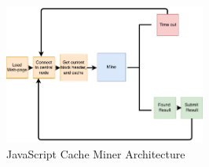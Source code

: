 \documentclass[10pt, conference, compsocconf]{IEEEtran}
\begin{document}
\begin{figure}[H]
\centering
\includegraphics[width=250px,keepaspectratio]{Hybrid-Miner.pdf}
\caption{\label{fig:hybridArchitecture} JavaScript Cache Miner Architecture}
\end{figure}



\end{document}
